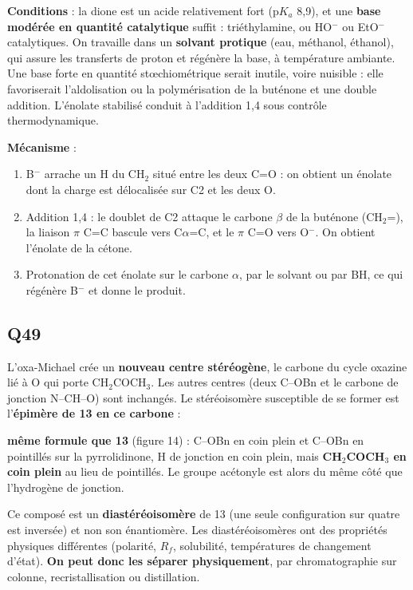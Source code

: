 \documentclass[11pt,a4paper]{article}
\providecommand{\tightlist}{\setlength{\itemsep}{0pt}\setlength{\parskip}{0pt}}
\begin{document}
\textbf{Conditions} : la dione est un acide relativement fort (p\(K_a\) 8,9), et une \textbf{base modérée en quantité catalytique} suffit : triéthylamine, ou HO\(^-\) ou EtO\(^-\) catalytiques. On travaille dans un \textbf{solvant protique} (eau, méthanol, éthanol), qui assure les transferts de proton et régénère la base, à température ambiante. Une base forte en quantité stœchiométrique serait inutile, voire nuisible : elle favoriserait l'aldolisation ou la polymérisation de la buténone et une double addition. L'énolate stabilisé conduit à l'addition 1,4 sous contrôle thermodynamique.

\textbf{Mécanisme} :

\begin{enumerate}
\def\labelenumi{\arabic{enumi}.}
\tightlist
\item
  B\(^-\) arrache un H du CH\(_2\) situé entre les deux C=O : on obtient un énolate dont la charge est délocalisée sur C2 et les deux O.
\item
  Addition 1,4 : le doublet de C2 attaque le carbone \(\beta\) de la buténone (CH\(_2\)=), la liaison \(\pi\) C=C bascule vers C\(\alpha\)=C, et le \(\pi\) C=O vers O\(^-\). On obtient l'énolate de la cétone.
\item
  Protonation de cet énolate sur le carbone \(\alpha\), par le solvant ou par BH, ce qui régénère B\(^-\) et donne le produit.
\end{enumerate}

\hypertarget{q49}{%
\subsection{Q49}\label{q49}}

L'oxa-Michael crée un \textbf{nouveau centre stéréogène}, le carbone du cycle oxazine lié à O qui porte CH\(_2\)COCH\(_3\). Les autres centres (deux C--OBn et le carbone de jonction N--CH--O) sont inchangés. Le stéréoisomère susceptible de se former est l'\textbf{épimère de 13 en ce carbone} :

\textbf{même formule que 13} (figure 14) : C--OBn en coin plein et C--OBn en pointillés sur la pyrrolidinone, H de jonction en coin plein, mais \textbf{CH\(_2\)COCH\(_3\) en coin plein} au lieu de pointillés. Le groupe acétonyle est alors du même côté que l'hydrogène de jonction.

Ce composé est un \textbf{diastéréoisomère} de 13 (une seule configuration sur quatre est inversée) et non son énantiomère. Les diastéréoisomères ont des propriétés physiques différentes (polarité, \(R_f\), solubilité, températures de changement d'état). \textbf{On peut donc les séparer physiquement}, par chromatographie sur colonne, recristallisation ou distillation.
\end{document}
